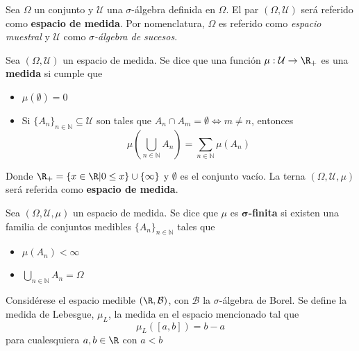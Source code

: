 \begin{definicion}
Sea $\Omega$ un conjunto y $\mathcal{U}$ una $\sigma$-álgebra definida en $\Omega$. El par $(\Omega,\mathcal{U})$ será referido como \textbf{espacio de medida}. Por nomenclatura, $\Omega$ es referido como \textit{espacio muestral} y $\mathcal{U}$ como \textit{$\sigma$-álgebra de sucesos}.
\end{definicion}

\begin{definicion}%
Sea $(\Omega, \mathcal{U})$ un espacio de medida. Se dice que una función $\mu : \mathcal{U} \rightarrow \R_+$ es una \textbf{medida} si cumple que
\begin{itemize}
\item $\mu(\emptyset) = 0$
\item Si $\{ A_n \}_{n\in \mathbb{N}} \subseteq \mathcal{U}$ son tales que 
$A_n \cap A_m = \emptyset \Leftrightarrow m\neq n$, entonces
$$ \mu\left( \bigcup_{n\in \mathbb{N}} A_n \right) = \sum_{n\in \mathbb{N}} \mu(A_n)$$
\end{itemize}
Donde $\R_+ = \{ x\in \R | 0 \leq x \} \cup \{ \infty \}$ y $\emptyset$ es el conjunto vacío.
La terna $(\Omega,\mathcal{U},\mu)$ será referida como \textbf{espacio de medida}.
\label{medida}
\end{definicion}

\begin{definicion}%
Sea $(\Omega,\mathcal{U},\mu)$ un espacio de medida. Se dice que $\mu$ es 
\textbf{$\boldsymbol{\sigma}$-finita} si existen una familia de conjuntos medibles $\{ A_n \}_{n\in \mathbb{N}}$ tales que
\begin{itemize}
\item $\mu\left( A_n \right) < \infty$
\item $ \bigcup_{n\in \mathbb{N}} A_n = \Omega$
\end{itemize}
\end{definicion}

\begin{definicion}
Considérese el espacio medible $(\R, \mathcal{B})$, con $\mathcal{B}$ la $\sigma$-álgebra de Borel. Se define la medida de Lebesgue, $\mu_L$, la medida en el espacio mencionado tal que 
\begin{equation}
\mu_L([a,b]) = b-a
\end{equation}
para cualesquiera $a,b \in \R$ con $a<b$
\end{definicion}

